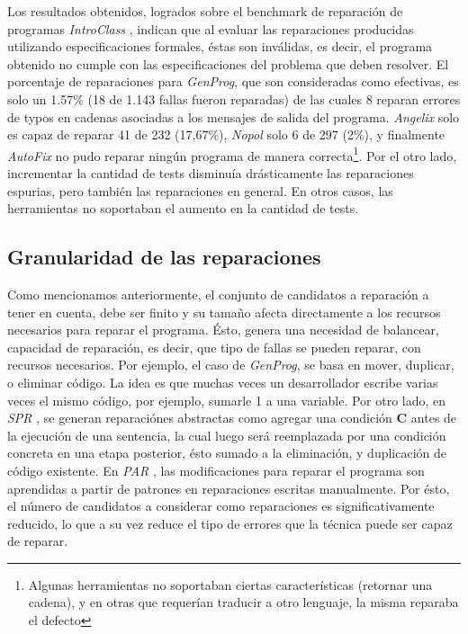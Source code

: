 Los resultados obtenidos, logrados sobre el benchmark de reparaci\'on de programas \emph{IntroClass} \cite{bibliography.repair.benchmarks.GouesHSBDFW15}, indican que al evaluar las reparaciones producidas utilizando especificaciones formales, \'estas son inv\'alidas, es decir, el programa obtenido no cumple con las especificaciones del problema que deben resolver. El porcentaje de reparaciones para \emph{GenProg}, que son consideradas como efectivas, es solo un 1.57\% (18 de 1.143 fallas fueron reparadas) de las cuales 8 reparan errores de typos en cadenas asociadas a los mensajes de salida del programa. \emph{Angelix} solo es capaz de reparar 41 de 232 (17,67\%), \emph{Nopol} solo 6 de 297 (2\%), y finalmente \emph{AutoFix} no pudo reparar ning\'un programa de manera correcta\footnote{Algunas herramientas no soportaban ciertas caracter\'isticas (retornar una cadena), y en otras que requer\'ian traducir a otro lenguaje, la misma reparaba el defecto}. Por el otro lado, incrementar la cantidad de tests disminu\'ia dr\'asticamente las reparaciones espurias, pero tambi\'en las reparaciones en general. En otros casos, las herramientas no soportaban el aumento en la cantidad de tests.

\subsection{Granularidad de las reparaciones}
\label{sec:repair.granularity}

Como mencionamos anteriormente, el conjunto de candidatos a reparaci\'on a tener en cuenta, debe ser finito y su tama\~no afecta directamente a los recursos necesarios para reparar el programa. \'Esto, genera una necesidad de balancear, capacidad de reparaci\'on, es decir, que tipo de fallas se pueden reparar, con recursos necesarios. Por ejemplo, el caso de \emph{GenProg}, se basa en mover, duplicar, o eliminar c\'odigo. La idea es que muchas veces un desarrollador escribe varias veces el mismo c\'odigo, por ejemplo, sumarle 1 a una variable. Por otro lado, en \emph{SPR} \cite{bibliography.repair.LongR15}, se generan reparaci\'ones abstractas como agregar una condici\'on \textbf{C} antes de la ejecuci\'on de una sentencia, la cual luego ser\'a reemplazada por una condici\'on concreta en una etapa posterior, \'esto sumado a la eliminaci\'on, y duplicaci\'on de c\'odigo existente. En \emph{PAR} \cite{bibliography.repair.KimNSK13}, las modificaciones para reparar el programa son aprendidas a partir de patrones en reparaciones escritas manualmente. Por \'esto, el n\'umero de candidatos a considerar como reparaciones es significativamente reducido, lo que a su vez reduce el tipo de errores que la t\'ecnica puede ser capaz de reparar.

